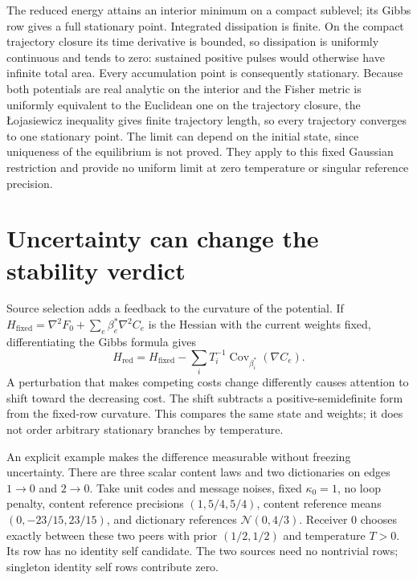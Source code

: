 The reduced energy attains an interior minimum on a compact sublevel; its Gibbs row gives a full stationary point. Integrated dissipation is finite. On the compact trajectory closure its time derivative is bounded, so dissipation is uniformly continuous and tends to zero: sustained positive pulses would otherwise have infinite total area. Every accumulation point is consequently stationary. Because both potentials are real analytic on the interior and the Fisher metric is uniformly equivalent to the Euclidean one on the trajectory closure, the {\L}ojasiewicz inequality gives finite trajectory length, so every trajectory converges to one stationary point. The limit can depend on the initial state, since uniqueness of the equilibrium is not proved. They apply to this fixed Gaussian restriction and provide no uniform limit at zero temperature or singular reference precision.

\section{Uncertainty can change the stability verdict}
\label{c18:threshold}

Source selection adds a feedback to the curvature of the potential. If $H_{\mathrm{fixed}}=\nabla^2F_0+\sum_e\beta_e^*\nabla^2C_e$ is the Hessian with the current weights fixed, differentiating the Gibbs formula gives
\begin{equation}
 H_{\mathrm{red}}=H_{\mathrm{fixed}}
       -\sum_iT_i^{-1}\operatorname{Cov}_{\beta_i^*}(\nabla C_e).
 \label{c18:row-curvature}
\end{equation}
A perturbation that makes competing costs change differently causes attention to shift toward the decreasing cost. The shift subtracts a positive-semidefinite form from the fixed-row curvature. This compares the same state and weights; it does not order arbitrary stationary branches by temperature.

An explicit example makes the difference measurable without freezing uncertainty. There are three scalar content laws and two dictionaries on edges $1\to0$ and $2\to0$. Take unit codes and message noises, fixed $\kappa_0=1$, no loop penalty, content reference precisions $(1,5/4,5/4)$, content reference means $(0,-23/15,23/15)$, and dictionary references $\mathcal N(0,4/3)$. Receiver $0$ chooses exactly between these two peers with prior $(1/2,1/2)$ and temperature $T>0$. Its row has no identity self candidate. The two sources need no nontrivial rows; singleton identity self rows contribute zero.

